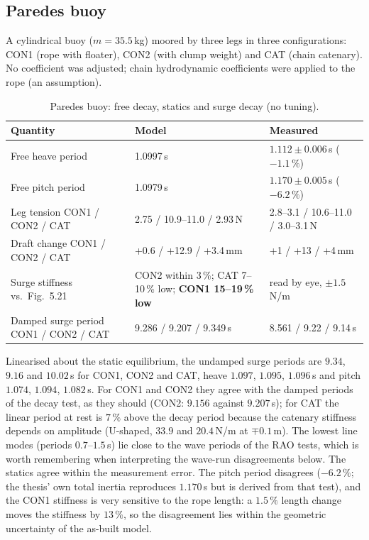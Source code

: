 \documentclass[11pt,a4paper]{article}
\begin{document}
\subsection{Paredes buoy \cite{paredes2016}}
A cylindrical buoy ($m=35.5$\,kg) moored by three legs in three configurations: CON1 (rope with floater), CON2 (with clump weight) and CAT (chain catenary). No coefficient was adjusted; chain hydrodynamic coefficients were applied to the rope (an assumption).
\begin{table}[h]
\centering\small
\begin{tabular}{p{5.2cm}p{4.2cm}p{4.2cm}}
\toprule
Quantity & Model & Measured \\
\midrule
Free heave period & 1.0997\,s & $1.112\pm0.006$\,s ($-1.1\,\%$) \\
Free pitch period & 1.0979\,s & $1.170\pm0.005$\,s ($\mathbf{-6.2\,\%}$) \\
Leg tension CON1 / CON2 / CAT & 2.75 / 10.9--11.0 / 2.93\,N & 2.8--3.1 / 10.6--11.0 / 3.0--3.1\,N \\
Draft change CON1 / CON2 / CAT & +0.6 / +12.9 / +3.4\,mm & +1 / +13 / +4\,mm \\
Surge stiffness vs.\ Fig.~5.21 & CON2 within 3\,\%; CAT 7--10\,\% low; \textbf{CON1 15--19\,\% low} & read by eye, $\pm1.5$\,N/m \\
Damped surge period CON1 / CON2 / CAT & 9.286 / 9.207 / 9.349\,s & 8.561 / 9.22 / 9.14\,s \\
\bottomrule
\end{tabular}
\caption{Paredes buoy: free decay, statics and surge decay (no tuning).}\label{tab:paredes}
\end{table}
Linearised about the static equilibrium, the undamped surge periods are $9.34$, $9.16$ and $10.02$\,s for CON1, CON2 and CAT, heave $1.097$, $1.095$, $1.096$\,s and pitch $1.074$, $1.094$, $1.082$\,s. For CON1 and CON2 they agree with the damped periods of the decay test, as they should (CON2: $9.156$ against $9.207$\,s); for CAT the linear period at rest is $7\,\%$ above the decay period because the catenary stiffness depends on amplitude (U-shaped, $33.9$ and $20.4$\,N/m at $\mp0.1$\,m). The lowest line modes (periods $0.7$--$1.5$\,s) lie close to the wave periods of the RAO tests, which is worth remembering when interpreting the wave-run disagreements below. The statics agree within the measurement error. The pitch period disagrees ($-6.2\,\%$; the thesis' own total inertia reproduces $1.170$\,s but is derived from that test), and the CON1 stiffness is very sensitive to the rope length: a $1.5\,\%$ length change moves the stiffness by $13\,\%$, so the disagreement lies within the geometric uncertainty of the as-built model.
\end{document}
